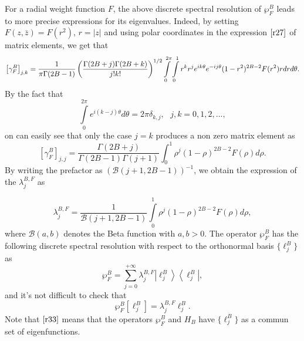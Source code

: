 For a radial weight function $F$, the above discrete spectral resolution of $%
\wp _{F}^{B}$ leads to more precise expressions for its eigenvalues. Indeed,
by setting $F(z,\bar{z})=F(r^{2})$, $r=\left\vert z\right\vert $ and using
polar coordinates in the expression $\eqref{r27} $ of matrix elements,
we get that 
\begin{equation}
\label{r28}
\left[ \gamma _{F}^{B}\right] _{j,k}=\frac{1}{\pi \Gamma (2B-1)}\left( \frac{%
\Gamma (2B+j)\Gamma (2B+k)}{j!k!}\right) ^{1/2}\int\limits_{0}^{2\pi
}\int\limits_{0}^{1}r^{k}r^{j}e^{ik\theta }e^{-ij\theta
}(1-r^{2})^{2B-2}F(r^{2})rdrd\theta .  
\end{equation}
By the fact that 
\begin{equation}
\label{r29}
\int\limits_{0}^{2\pi }e^{i(k-j)\theta }d\theta =2\pi \delta _{k,j},\text{ \ 
}j,k=0,1,2,...,  
\end{equation}
on can easily see that only the case $j=k$ produces a non zero matrix
element as 
\begin{equation}
\label{r30}
\left[ \gamma _{F}^{B}\right] _{j,j}=\frac{\Gamma (2B+j)}{\Gamma
(2B-1)\Gamma (j+1)}\int_{0}^{1}\rho ^{j}(1-\rho )^{2B-2}F(\rho )d\rho . 
\end{equation}
By writing the prefactor as $\left( \mathcal{B}(j+1,2B-1)\right) ^{-1}$, we
obtain the expression of the $\lambda _{j}^{B,F}$ as

\begin{equation}
\label{r31}
\lambda _{j}^{B,F}=\frac{1}{\mathcal{B}(j+1,2B-1)}\int\limits_{0}^{1}\rho
^{j}(1-\rho )^{2B-2}F(\rho )d\rho ,  
\end{equation}
where $\mathcal{B}(a,b)$ denotes the Beta function with $a,b>0$. The
operator $\wp _{F}^{B}$ has the following discrete spectral resolution with
respect to the orthonormal basis $\{\ell _{j}^{B}\}$ as 
\begin{equation}
\label{r32}
\wp _{F}^{B}=\sum_{j=0}^{+\infty }\lambda _{j}^{B,F}\left\vert \ell
_{j}^{B}\right\rangle \left\langle \ell _{j}^{B}\right\vert ,  
\end{equation}
and it's not difficult to check that 
\begin{equation}
\label{r33}
\wp _{F}^{B}\left[ \ell _{j}^{B}\right] =\lambda _{j}^{B,F}\ell _{j}^{B}. 
\end{equation}
Note that $\eqref{r33} $ means that the operators $\wp _{F}^{B}$ and $%
H_{B}$ have $\{\ell _{j}^{B}\}$ as a commun set of eigenfunctions.

\smallskip

